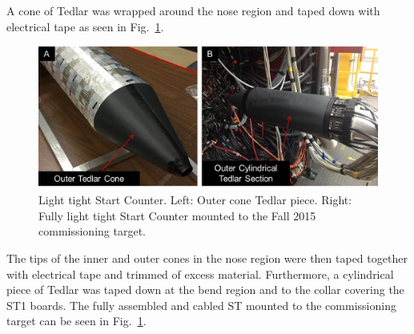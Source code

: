 A cone of Tedlar was wrapped around the nose region and taped down with electrical tape as seen in Fig.~\ref{fig:light_tight_st}. 
\begin{figure}[!htb]
	\centering
	\includegraphics[width=1.0\columnwidth]{fabrication/figs/st_lt}
	\caption{Light tight Start Counter.  Left: Outer cone Tedlar piece.  Right: Fully light tight Start Counter mounted to the Fall 2015 commissioning target.}
	\label{fig:light_tight_st}
\end{figure}
The tips of the inner and outer cones in the nose region were then taped together with electrical tape and trimmed of excess material. Furthermore, a cylindrical piece of Tedlar was taped down at the bend region and to the collar covering the ST1 boards.  The fully assembled and cabled ST mounted to the commissioning target can be seen in Fig.~\ref{fig:light_tight_st}. 









